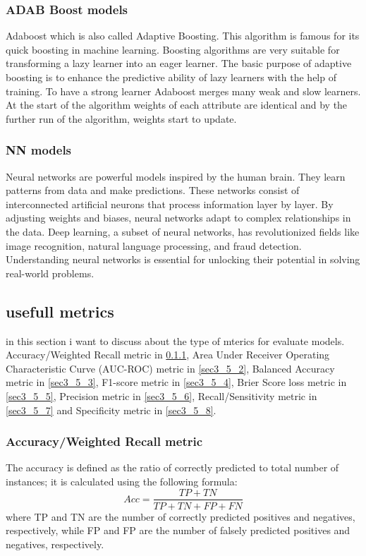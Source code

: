 \documentclass[preprint,12pt]{elsarticle}
\begin{document}
\subsubsection{ADAB Boost models}
\label{sec3_4_7}
Adaboost which is also called Adaptive Boosting. This algorithm is famous for its quick boosting in machine learning. Boosting algorithms are very suitable for transforming a lazy learner into an eager learner. The basic purpose of adaptive boosting is to enhance the predictive ability of lazy learners with the help of training. To have a strong learner Adaboost merges many weak and slow learners. At the start of the algorithm weights of each attribute are identical and by the further run of the algorithm, weights start to update.

\subsubsection{NN models}
\label{sec3_4_8}
Neural networks are powerful models inspired by the human brain. They learn patterns from data and make predictions. These networks consist of interconnected artificial neurons that process information layer by layer. By adjusting weights and biases, neural networks adapt to complex relationships in the data. Deep learning, a subset of neural networks, has revolutionized fields like image recognition, natural language processing, and fraud detection. Understanding neural networks is essential for unlocking their potential in solving real-world problems.



\subsection{usefull metrics}
\label{sec3_5}




in this section i want to discuss about the type of mterics for evaluate models.
Accuracy/Weighted Recall metric in \ref{sec3_5_1},
Area Under Receiver Operating Characteristic Curve (AUC-ROC) metric in \ref{sec3_5_2},
Balanced Accuracy metric in \ref{sec3_5_3},
F1-score  metric in \ref{sec3_5_4},
Brier Score loss metric in \ref{sec3_5_5},
Precision metric in \ref{sec3_5_6},
Recall/Sensitivity  metric in \ref{sec3_5_7} and
Specificity  metric in \ref{sec3_5_8}.

\subsubsection{Accuracy/Weighted Recall metric}
\label{sec3_5_1}
The accuracy is defined as the ratio of correctly predicted to total number of instances; it is calculated using the following formula:
$$Acc=\frac{TP+TN}{TP+TN+FP+FN}$$
where TP and TN are the number of correctly predicted positives and negatives, respectively, while FP and FP are the number of falsely predicted positives and negatives, respectively.
\end{document}
